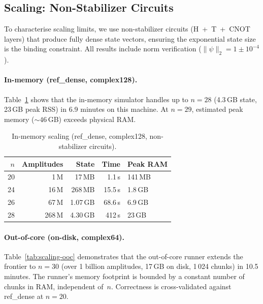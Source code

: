 \subsection{Scaling: Non-Stabilizer Circuits}
\label{sec:scaling}

To characterise scaling limits, we use non-stabilizer circuits
(H~+~T~+~CNOT layers) that produce fully dense state vectors, ensuring
the exponential state size is the binding constraint. All results
include norm verification ($\|\psi\|_2 = 1 \pm 10^{-4}$).

\paragraph{In-memory (ref\_dense, complex128).}
Table~\ref{tab:scaling-inmem} shows that the in-memory simulator
handles up to $n = 28$ (4.3\,GB state, 23\,GB peak RSS) in 6.9
minutes on this machine. At $n = 29$, estimated peak memory
(${\sim}46$\,GB) exceeds physical RAM.

\begin{table}[h]
\centering
\caption{In-memory scaling (ref\_dense, complex128, non-stabilizer circuits).}
\label{tab:scaling-inmem}
\begin{tabular}{rrrrl}
\toprule
$n$ & Amplitudes & State & Time & Peak RAM \\
\midrule
20 &        1\,M &   17\,MB &    1.1\,s & 141\,MB \\
24 &       16\,M &  268\,MB &   15.5\,s & 1.8\,GB \\
26 &       67\,M & 1.07\,GB &   68.6\,s & 6.9\,GB \\
28 &      268\,M & 4.30\,GB &  412\,s   & 23\,GB \\
\bottomrule
\end{tabular}
\end{table}

\paragraph{Out-of-core (on-disk, complex64).}
Table~\ref{tab:scaling-ooc} demonstrates that the out-of-core runner
extends the frontier to $n = 30$ (over 1 billion amplitudes, 17\,GB
on disk, 1\,024 chunks) in 10.5 minutes. The runner's memory footprint
is bounded by a constant number of chunks in RAM, independent of~$n$.
Correctness is cross-validated against ref\_dense at $n = 20$.

